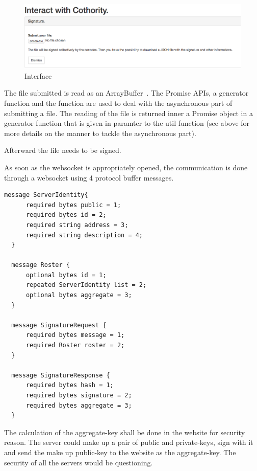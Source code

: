 \documentclass[11pt, a4paper, twoside, openright, openany]{book} %
\begin{document}
\begin{figure}[ht!]
\centering
\includegraphics[width=125mm]{verification_signature.jpg}
\caption{Interface}
\end{figure}
\leavevmode \newline

The file submitted is read as an ArrayBuffer~\cite{ArrayBuffer}. The Promise APIs,
a generator function and the  function are used to deal with
the asynchronous part of submitting a file. The reading of the file is returned
inner a Promise object in a generator function that is given in paramter to the
 util function (see above for more details on
the manner to tackle the asynchronous part). %
\bigbreak

Afterward the file needs to be signed.
\newline

As soon as the websocket is appropriately opened, the communication is done through a websocket
using 4 protocol buffer messages.
\bigbreak

\begin{lstlisting}[caption={.proto file}, captionpos=b]
  message ServerIdentity{
      required bytes public = 1;
      required bytes id = 2;
      required string address = 3;
      required string description = 4;
  }

  message Roster {
      optional bytes id = 1;
      repeated ServerIdentity list = 2;
      optional bytes aggregate = 3;
  }

  message SignatureRequest {
      required bytes message = 1;
      required Roster roster = 2;
  }

  message SignatureResponse {
      required bytes hash = 1;
      required bytes signature = 2;
      required bytes aggregate = 3;
  }
\end{lstlisting}
\leavevmode \newline

The calculation of the aggregate-key shall be done in the website for security reason.
The server could make up a pair of public and private-keys, sign with it and send
the make up public-key to the website as the aggregate-key. The security of all
the servers would be questioning.
\bigbreak
\end{document}
